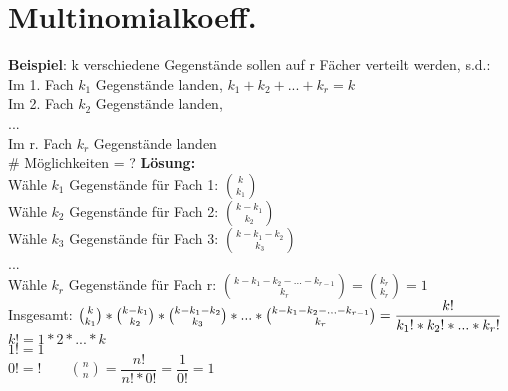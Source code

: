  \section{Multinomialkoeff.}
 	\textbf{Beispiel}: k verschiedene Gegenstände sollen auf r Fächer verteilt werden, s.d.:\\
 	Im 1. Fach $k_1$ Gegenstände landen, \hspace{1cm} $k_1 +k_2+ ... + k_r = k$\\
 	Im 2. Fach $k_2$ Gegenstände landen,\\...\\
 	Im r. Fach $k_r$ Gegenstände landen\smallskip\\\# Möglichkeiten = ?\newpage
 	\textbf{Lösung:}\\
 	 Wähle $k_1$ Gegenstände für Fach 1: $\binom{k}{k_1}$\smallskip\\
 	Wähle $k_2$ Gegenstände für Fach 2: $\binom{k-k_1}{k_2}$\smallskip\\
 	Wähle $k_3$ Gegenstände für Fach 3: $\binom{k-k_1-k_2}{k_3}$\\
 	...\\
 	Wähle $k_r$ Gegenstände für Fach r: $\binom{k-k_1-k_2-...-k_{r-1}}{k_r} = \binom{k_r}{k_r} = 1$\medskip\\
 	Insgesamt: $\binom{k}{k_1}*\binom{k-k_1}{k_2}*\binom{k-k_1-k_2}{k_3}*...*\binom{k-k_1-k_2-...-k_{r-1}}{k_r} = \\\dfrac{k!}{k_1!*k_2!*...*k_r!}$\medskip\\
 	$k! = 1 * 2 * ... * k$\\
 	$1! = 1$\\
 	$0! = ! \qquad \binom{n}{n} = \dfrac{n!}{n!*0!}=\dfrac{1}{0!}=1$
